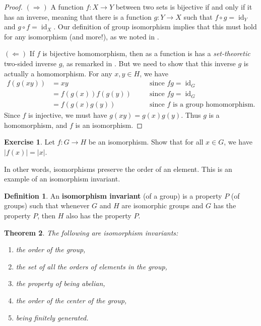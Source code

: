 \documentclass[12pt]{report}
\newtheorem{theorem}{Theorem}[chapter]
\numberwithin{equation}{section}
\numberwithin{theorem}{chapter}
\theoremstyle{definition}
\newtheorem{definition}[theorem]{Definition}
\newtheorem{exercise}{Exercise}
\newtheorem*{basic properties}{Basic Properties}
\newtheorem*{Important Remark}{Important Remark}
\newcommand{\df}[1]{{\bf #1}\index{#1}}
\DeclareMathOperator{\id}{id}
\begin{document}
\begin{proof} 
$(\Rightarrow)$ A function $f: X \to Y$ between two sets is bijective if and only if it has an inverse, meaning that there is a function $g: Y \to X$ such that $f \circ g = \id_Y$ and $g \circ f = \id_X$. Our definition of group isomorphism implies that this must hold for any isomorphism (and more!), as we noted in .

$(\Leftarrow)$ If $f$ is bijective homomorphism, then as a function is has a {\em set-theoretic} two-sided inverse $g$, as remarked in . But we need to show that this inverse $g$ is actually a homomorphism. For any $x,y \in H$, we have 
$$\begin{aligned}
f(g(xy)) & = xy \quad && \textrm{since } fg=\id_G \\
& = f(g(x))f(g(y)) \quad && \textrm{since } fg=\id_G\\
& = f(g(x)g(y)) \quad && \textrm{since $f$ is a group homomorphism} .
\end{aligned}$$ 
 Since $f$ is injective, we must have $g(xy) = g(x)g(y)$. Thus $g$ is a homomorphism, and $f$ is an isomorphism.
\end{proof}


\begin{exercise}\label{isos preserve order}
	Let $f\!: G \to H$ be an isomorphism. Show that for all $x \in G$, we have $|f(x)| = |x|$.
\end{exercise}

In other words, isomorphisms preserve the order of an element. This is an example of an isomorphism invariant.


\begin{definition}\label{def:isoinvariant}
An \df{isomorphism invariant} (of a group) is a property $P$ (of groups) such that whenever $G$ and $H$ are isomorphic groups and $G$ has the property $P$, then $H$ also has the property $P$.
 \end{definition}


\begin{theorem}\label{isoinvariants}
The following are isomorphism invariants:
\begin{enumerate}[leftmargin=20pt,label=(\alph*)]
\item the order of the group,
\item the set of all the orders of elements in the group,
\item the property of being abelian,
\item the order of the center of the group,
\item being finitely generated.
\end{enumerate}
\end{theorem}
\end{document}
